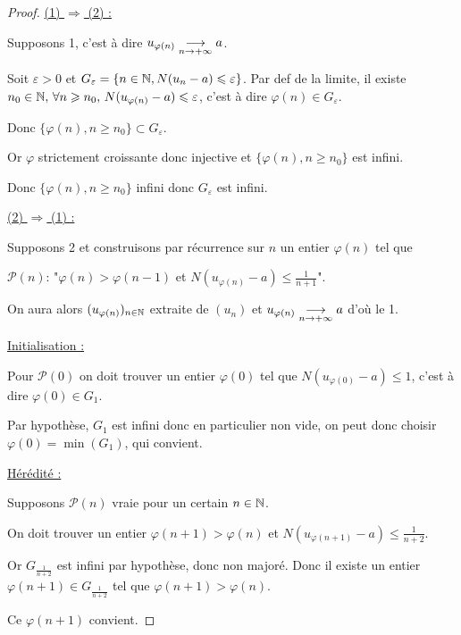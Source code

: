 \begin{proof}
    \qquad \uline{(1) $\Rightarrow$ (2) :}

    \avspace Supposons 1, c'est à dire $u_{\varphi(n)} \underset{n \to +\infty}{\longrightarrow} a$.

    Soit $\varepsilon > 0$ et $G_\varepsilon = \{n \in \mathbb{N}, N(u_n - a) \leqslant \varepsilon\}$.
    Par def de la limite, il existe $n_0 \in \mathbb{N}, \, \forall n \geqslant n_0, \, N(u_{\varphi(n)} - a) \leqslant \varepsilon$, 
    c'est à dire $\varphi(n) \in G_\varepsilon$.

    Donc $\{\varphi(n), n \geqslant n_0\} \subset G_\varepsilon$.

    Or $\varphi$ strictement croissante donc injective et $\{\varphi(n), n \geqslant n_0\}$ est infini.
    
    Donc $\{\varphi(n), n \geqslant n_0\}$ infini donc $G_\varepsilon$ est infini.

    \avspace \qquad \uline{(2) $\Rightarrow$ (1) :}

    \svspace Supposons 2 et construisons par récurrence sur $n$ un entier $\varphi(n)$ tel que

    $\mathscr P(n)$: "$\varphi(n) > \varphi(n - 1)$ et $N(u_{\varphi(n)} - a) \leqslant \frac 1 {n + 1}$".

    On aura alors $(u_{\varphi(n)})_{n \in \mathbb{N}}$ extraite de $(u_n)$ et $u_{\varphi(n)} \underset{n \to +\infty}{\longrightarrow} a$
    d'où le 1. 

    \quad \uline{Initialisation :}

    \svspace Pour $\mathscr P(0)$ on doit trouver un entier $\varphi(0)$ tel que
    $N(u_{\varphi(0)} - a) \leqslant 1$, c'est à dire $\varphi(0) \in G_1$.

    Par hypothèse, $G_1$ est infini donc en particulier non vide, on peut donc 
    choisir $\varphi(0)  = \min(G_1)$, qui convient. 

    \quad \uline{Hérédité :}

    \svspace Supposons $\mathscr P(n)$ vraie pour un certain $n \in \mathbb{N}$.

    On doit trouver un entier $\varphi(n+1) > \varphi(n)$ et 
    $N(u_{\varphi(n + 1)} - a) \leqslant \frac 1 {n + 2}$. 

    Or $G_{\frac 1 {n + 2}}$ est infini par hypothèse, donc non majoré. Donc il existe
    un entier $\varphi(n + 1) \in G_{\frac 1 {n + 2}}$ tel que $\varphi(n + 1) > \varphi(n)$.

    Ce $\varphi(n + 1)$ convient.
\end{proof}

